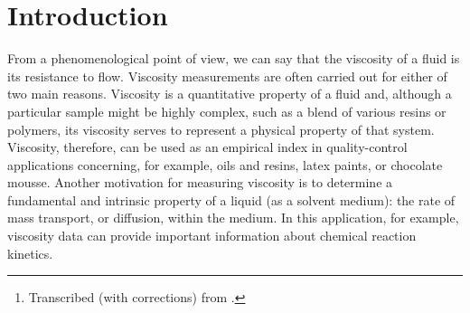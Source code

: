 
\maketitle%

\begin{abstract}
\noindent
The objective of this lab is to determine the viscosity-average molecular weight of poly(vinyl alcohol) (PVOH) and the fraction of ``head-to-head'' monomer linkages in the polymer.\thanks{Transcribed (with corrections) from \textcite{halpern97}.} %
\end{abstract}

\section{Introduction} %
\label{sec:intro}

From a phenomenological point of view, we can say that the viscosity of a fluid is its resistance to flow. 
Viscosity measurements are often carried out for either of two main reasons. 
Viscosity is a quantitative property of a fluid and, although a particular sample might be highly complex, such as a blend of various resins or polymers, its viscosity serves to represent a physical property of that system. 
Viscosity, therefore, can be used as an empirical index in quality-control applications concerning, for example, oils and resins, latex paints, or chocolate mousse. 
Another motivation for measuring viscosity is to determine a fundamental and intrinsic property of a liquid (as a solvent medium): the rate of mass transport, or diffusion, within the medium. 
In this application, for example, viscosity data can provide important information about chemical reaction kinetics. 

